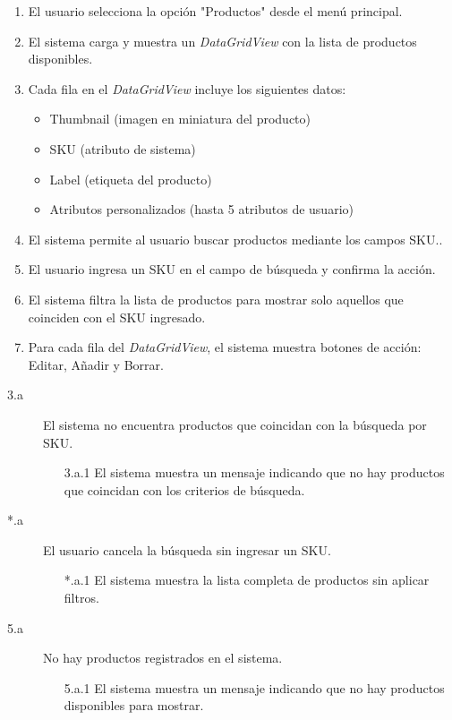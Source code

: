 \begin{enumerate}
    \item El usuario selecciona la opción "Productos" desde el menú principal.
    \item El sistema carga y muestra un \textit{DataGridView} con la lista de productos disponibles.
    \item Cada fila en el \textit{DataGridView} incluye los siguientes datos:
    \begin{itemize}
        \item Thumbnail (imagen en miniatura del producto)
        \item SKU (atributo de sistema)
        \item Label (etiqueta del producto)
        \item Atributos personalizados (hasta 5 atributos de usuario)
    \end{itemize}
    \item El sistema permite al usuario buscar productos mediante los campos SKU..
    \item El usuario ingresa un SKU en el campo de búsqueda y confirma la acción.
    \item El sistema filtra la lista de productos para mostrar solo aquellos que coinciden con el SKU ingresado.
    \item Para cada fila del \textit{DataGridView}, el sistema muestra botones de acción: Editar, Añadir y Borrar.
\end{enumerate}

\begin{description}
    \item[3.a] El sistema no encuentra productos que coincidan con la búsqueda por SKU.
    \begin{enumerate}
        \item[3.a.1] El sistema muestra un mensaje indicando que no hay productos que coincidan con los criterios de búsqueda.
    \end{enumerate}

    \item[*.a] El usuario cancela la búsqueda sin ingresar un SKU.
    \begin{enumerate}
        \item[*.a.1] El sistema muestra la lista completa de productos sin aplicar filtros.
    \end{enumerate}

    \item[5.a] No hay productos registrados en el sistema.
    \begin{enumerate}
        \item[5.a.1] El sistema muestra un mensaje indicando que no hay productos disponibles para mostrar.
    \end{enumerate}
\end{description}


